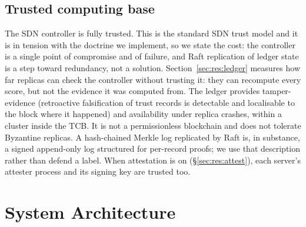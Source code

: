 \documentclass[10pt,twocolumn,letterpaper]{article}
\begin{document}
\subsection{Trusted computing base}
The SDN controller is fully trusted. This is the standard SDN trust model and
it is in tension with the doctrine we implement, so we state the cost: the
controller is a single point of compromise and of failure, and Raft replication
of ledger state is a step toward redundancy, not a solution. Section~\ref{sec:res:ledger}
measures how far replicas can check the controller without trusting it: they
can recompute every score, but not the evidence it was computed from. The ledger
provides tamper-evidence (retroactive falsification of trust records is
detectable and localisable to the block where it happened) and availability
under replica crashes, within a cluster inside the TCB. It is not a
permissionless blockchain and does not tolerate Byzantine replicas. A
hash-chained Merkle log replicated by Raft is, in substance, a signed
append-only log structured for per-record proofs; we use that description
rather than defend a label. When attestation is on
(\S\ref{sec:res:attest}), each server's attester process and its signing key
are trusted too.

\section{System Architecture}
\label{sec:arch}
\end{document}

